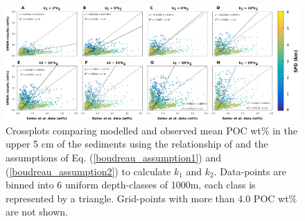 \documentclass[gmd, manuscript]{copernicus}
\begin{document}
\begin{figure}[tbp]
\begin{center}
	\includegraphics[width=1.0\textwidth]{figures/OMEN-GENIE-Exp/0_Boudreau_CROSSPLOTS_290817_noDEPTHDEP.pdf}
	\caption{Crossplots comparing modelled and observed mean POC wt\% in the upper 5 cm of the sediments using the relationship of \citet{boudreau1997diagenetic} and the assumptions of Eq. (\ref{boudreau_assumption1}) and 
	(\ref{boudreau_assumption2}) to calculate $k_1$ and $k_2$.  Data-points are binned into 6 uniform depth-classes of 1000m, each class is represented by a triangle. 
	Grid-points with more than 4.0 POC wt\% are not shown.}
	\label{fig:OMEN_GENIE_Boudreau_results}
\end{center}
\end{figure}
\end{document}
